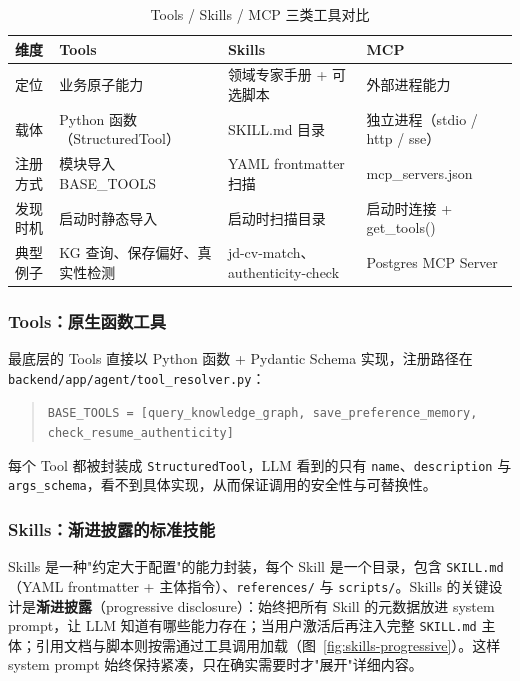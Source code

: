 \documentclass[12pt,a4paper]{ctexart}
\begin{document}
\begin{table}[H]
\centering
\renewcommand{\arraystretch}{1.3}
\caption{Tools / Skills / MCP 三类工具对比}
\label{tab:fc-compare}
{\small
\begin{tabular}{L{1.8cm} L{3.6cm} L{3.6cm} L{3.6cm}}
\toprule
\textbf{维度} & \textbf{Tools} & \textbf{Skills} & \textbf{MCP} \\
\midrule
定位 & 业务原子能力 & 领域专家手册 + 可选脚本 & 外部进程能力 \\
载体 & Python 函数（StructuredTool） & SKILL.md 目录 & 独立进程（stdio / http / sse）\\
注册方式 & 模块导入 BASE\_TOOLS & YAML frontmatter 扫描 & mcp\_servers.json \\
发现时机 & 启动时静态导入 & 启动时扫描目录 & 启动时连接 + get\_tools() \\
典型例子 & KG 查询、保存偏好、真实性检测 & jd-cv-match、authenticity-check & Postgres MCP Server \\
\bottomrule
\end{tabular}
}
\end{table}

\subsubsection{Tools：原生函数工具}

最底层的 Tools 直接以 Python 函数 + Pydantic Schema 实现，注册路径在 \texttt{backend/app/agent/tool\_resolver.py}：

\begin{quote}\small
\texttt{BASE\_TOOLS = [query\_knowledge\_graph, save\_preference\_memory, check\_resume\_authenticity]}
\end{quote}

每个 Tool 都被封装成 \texttt{StructuredTool}，LLM 看到的只有 \texttt{name}、\texttt{description} 与 \texttt{args\_schema}，看不到具体实现，从而保证调用的安全性与可替换性。

\subsubsection{Skills：渐进披露的标准技能}

Skills 是一种"约定大于配置"的能力封装，每个 Skill 是一个目录，包含 \texttt{SKILL.md}（YAML frontmatter + 主体指令）、\texttt{references/} 与 \texttt{scripts/}。Skills 的关键设计是\textbf{渐进披露}（progressive disclosure）：始终把所有 Skill 的元数据放进 system prompt，让 LLM 知道有哪些能力存在；当用户激活后再注入完整 \texttt{SKILL.md} 主体；引用文档与脚本则按需通过工具调用加载（图~\ref{fig:skills-progressive}）。这样 system prompt 始终保持紧凑，只在确实需要时才"展开"详细内容。
\end{document}
